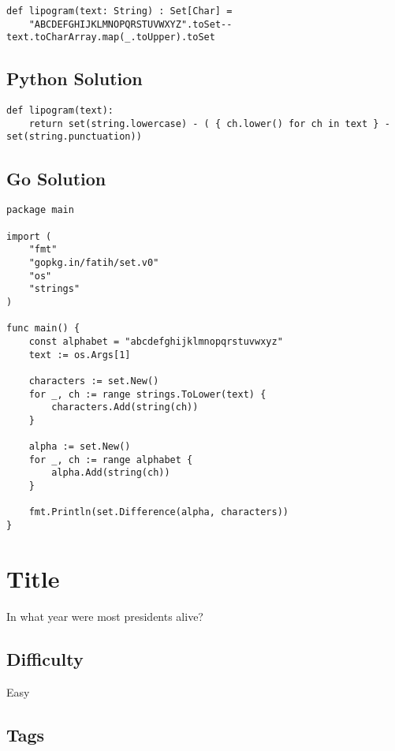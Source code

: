 \begin{verbatim}
def lipogram(text: String) : Set[Char] = 
    "ABCDEFGHIJKLMNOPQRSTUVWXYZ".toSet--text.toCharArray.map(_.toUpper).toSet
\end{verbatim}

\subsection{Python Solution}\label{python-solution-2}

\begin{verbatim}
def lipogram(text): 
    return set(string.lowercase) - ( { ch.lower() for ch in text } - set(string.punctuation))
\end{verbatim}

\subsection{Go Solution}\label{go-solution-2}

\begin{verbatim}
package main

import (
    "fmt"
    "gopkg.in/fatih/set.v0"
    "os"
    "strings"
)

func main() {
    const alphabet = "abcdefghijklmnopqrstuvwxyz"
    text := os.Args[1]

    characters := set.New()
    for _, ch := range strings.ToLower(text) {
        characters.Add(string(ch))
    }

    alpha := set.New()
    for _, ch := range alphabet {
        alpha.Add(string(ch))
    }

    fmt.Println(set.Difference(alpha, characters))
}
\end{verbatim}

\section{Title}\label{title-32}

In what year were most presidents alive?

\subsection{Difficulty}\label{difficulty-31}

Easy

\subsection{Tags}\label{tags-32}

